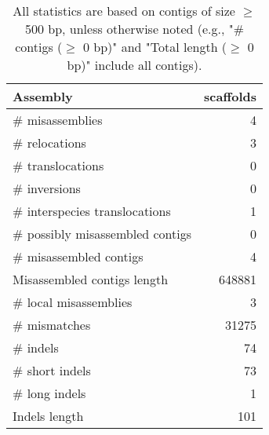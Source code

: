 \documentclass[12pt,a4paper]{article}
\begin{document}
\begin{table}[ht]
\begin{center}
\caption{All statistics are based on contigs of size $\geq$ 500 bp, unless otherwise noted (e.g., "\# contigs ($\geq$ 0 bp)" and "Total length ($\geq$ 0 bp)" include all contigs).}
\begin{tabular}{|l*{1}{|r}|}
\hline
Assembly & scaffolds \\ \hline
\# misassemblies & 4 \\ \hline
\hspace{5mm}\# relocations & 3 \\ \hline
\hspace{5mm}\# translocations & 0 \\ \hline
\hspace{5mm}\# inversions & 0 \\ \hline
\hspace{5mm}\# interspecies translocations & 1 \\ \hline
\# possibly misassembled contigs & 0 \\ \hline
\# misassembled contigs & 4 \\ \hline
Misassembled contigs length & 648881 \\ \hline
\# local misassemblies & 3 \\ \hline
\# mismatches & 31275 \\ \hline
\# indels & 74 \\ \hline
\hspace{5mm}\# short indels & 73 \\ \hline
\hspace{5mm}\# long indels & 1 \\ \hline
Indels length & 101 \\ \hline
\end{tabular}
\end{center}
\end{table}
\end{document}
